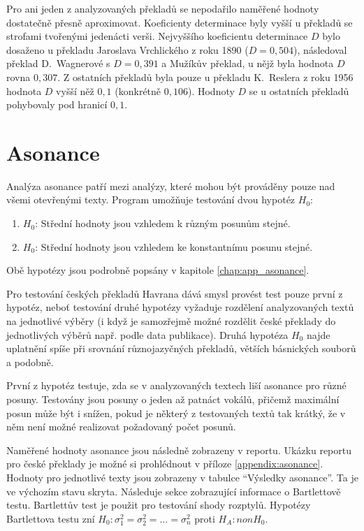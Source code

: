 \documentclass[dp.tex]{subfiles}
\begin{document}
Pro ani jeden z analyzovaných překladů se nepodařilo naměřené hodnoty dostatečně přesně aproximovat. Koeficienty determinace byly vyšší u překladů se strofami tvořenými jedenácti verši. Nejvyššího koeficientu determinace $D$ bylo dosaženo u překladu Jaroslava Vrchlického z roku 1890 ($D = 0,504$), následoval překlad D.~Wagnerové s $D = 0,391$ a Mužíkův překlad, u nějž byla hodnota $D$ rovna $0,307$. Z ostatních překladů byla pouze u překladu K.~Reslera z roku 1956 hodnota $D$ vyšší něž $0,1$ (konkrétně $0,106$). Hodnoty $D$ se u ostatních překladů pohybovaly pod hranicí $0,1$.

\section{Asonance}

Analýza asonance patří mezi analýzy, které mohou být prováděny pouze nad všemi otevřenými texty. Program umožňuje testování dvou hypotéz $H_0$:
\begin{enumerate}
\item $H_0$: Střední hodnoty jsou vzhledem k různým posunům stejné.
\item $H_0$: Střední hodnoty jsou vzhledem ke konstantnímu posunu stejné.
\end{enumerate}
Obě hypotézy jsou podrobně popsány v kapitole \ref{chap:app_asonance}.

Pro testování českých překladů Havrana dává smysl provést test pouze první z hypotéz, neboť testování druhé hypotézy vyžaduje rozdělení analyzovaných textů na jednotlivé výběry (i když je samozřejmě možné rozdělit české překlady do jednotlivých výběrů např. podle data publikace). Druhá hypotéza $H_0$ najde uplatnění spíše při srovnání různojazyčných překladů, větších básnických souborů a podobně.

První z hypotéz testuje, zda se v analyzovaných textech liší asonance pro různé posuny. Testovány jsou posuny o jeden až patnáct vokálů, přičemž maximální posun může být i snížen, pokud je některý z testovaných textů tak krátký, že v něm není možné realizovat požadovaný počet posunů.

Naměřené hodnoty asonance jsou následně zobrazeny v reportu. Ukázku reportu pro české překlady je možné si prohlédnout v příloze \ref{appendix:asonance}. Hodnoty pro jednotlivé texty jsou zobrazeny v tabulce \enquote{Výsledky asonance}. Ta je ve výchozím stavu skryta. Následuje sekce zobrazující informace o Bartlettově testu. Bartlettův test je použit pro testování shody rozptylů. Hypotézy Bartlettova testu zní $H_0: \sigma^2_1 = \sigma^2_2 = \dots = \sigma^2_n$ proti $H_A: non H_0$.
\end{document}

